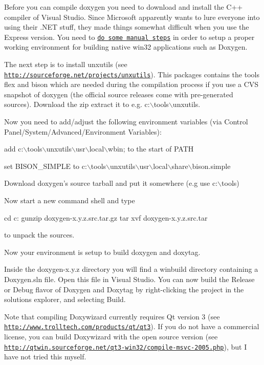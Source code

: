 Before you can compile doxygen you need to download and install the C++ compiler of Visual Studio. Since Microsoft apparently wants to lure everyone into using their .NET stuff, they made things somewhat difficult when you use the Express version. You need to \href{http://msdn2.microsoft.com/en-gb/express/aa700755.aspx}{\tt do some manual steps} in order to setup a proper working environment for building native win32 applications such as Doxygen.

The next step is to install unxutils (see \href{http://sourceforge.net/projects/unxutils}{\tt http://sourceforge.net/projects/unxutils}). This packages contains the tools {\ttfamily flex} and {\ttfamily bison} which are needed during the compilation process if you use a CVS snapshot of doxygen (the official source releases come with pre-\/generated sources). Download the zip extract it to e.g. {\ttfamily c:$\backslash$tools$\backslash$unxutils}.

Now you need to add/adjust the following environment variables (via Control Panel/System/Advanced/Environment Variables):
\begin{DoxyItemize}
\item add {\ttfamily c:$\backslash$tools$\backslash$unxutils$\backslash$usr$\backslash$local$\backslash$wbin;} to the start of {\ttfamily PATH}
\item set {\ttfamily BISON\_\-SIMPLE} to {\ttfamily c:$\backslash$tools$\backslash$unxutils$\backslash$usr$\backslash$local$\backslash$share$\backslash$bison.simple}
\end{DoxyItemize}

Download doxygen's source tarball and put it somewhere (e.g use {\ttfamily c:$\backslash$tools})

Now start a new command shell and type \begin{DoxyVerb}
cd c:\tools
gunzip doxygen-x.y.z.src.tar.gz
tar xvf doxygen-x.y.z.src.tar
\end{DoxyVerb}
 to unpack the sources.

Now your environment is setup to build {\ttfamily doxygen} and {\ttfamily doxytag}.

Inside the {\ttfamily doxygen-\/x.y.z} directory you will find a {\ttfamily winbuild} directory containing a {\ttfamily Doxygen.sln} file. Open this file in Visual Studio. You can now build the Release or Debug flavor of Doxygen and Doxytag by right-\/clicking the project in the solutions explorer, and selecting Build.

Note that compiling Doxywizard currently requires Qt version 3 (see \href{http://www.trolltech.com/products/qt/qt3}{\tt http://www.trolltech.com/products/qt/qt3}). If you do not have a commercial license, you can build Doxywizard with the open source version (see \href{http://qtwin.sourceforge.net/qt3-win32/compile-msvc-2005.php}{\tt http://qtwin.sourceforge.net/qt3-\/win32/compile-\/msvc-\/2005.php}), but I have not tried this myself.

